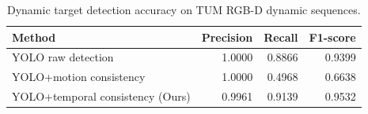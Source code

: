 \begin{table}[t]
\centering
\caption{Dynamic target detection accuracy on TUM RGB-D dynamic sequences.}
\label{tab:dynamic_detection_accuracy_final}
\begin{tabular}{lrrr}
\toprule
Method & Precision & Recall & F1-score \\
\midrule
YOLO raw detection & 1.0000 & 0.8866 & 0.9399 \\
YOLO+motion consistency & 1.0000 & 0.4968 & 0.6638 \\
YOLO+temporal consistency (Ours) & 0.9961 & 0.9139 & 0.9532 \\
\bottomrule
\end{tabular}
\end{table}

